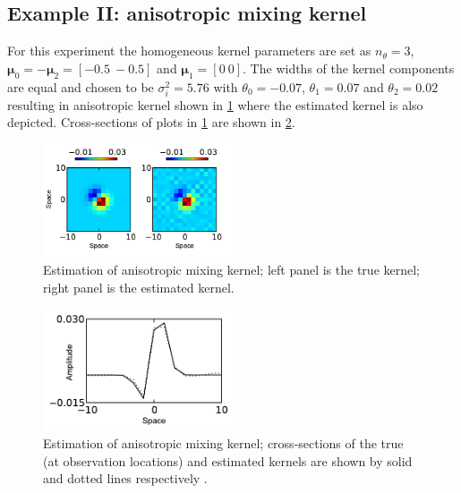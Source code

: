 \documentclass[10pt,twocolumn,twoside]{IEEEtran}
\begin{document}
\subsection{Example II: anisotropic mixing kernel}
For this experiment the homogeneous kernel parameters are set as $n_\theta=3$, $\boldsymbol\mu_0=-\boldsymbol\mu_2=[-0.5~-0.5]$ and $\boldsymbol\mu_1=[0~0]$. The widths  of the kernel components are equal and chosen to be $\sigma_i^2=5.76$ with $\theta_0=-0.07$, $\theta_1=0.07$ and $\theta_2=0.02$ resulting in anisotropic kernel shown in \figurename{\ref{fig:anisoKernel2d}} where the estimated kernel is also depicted. Cross-sections of plots in \figurename{\ref{fig:anisoKernel2d}} are shown in \figurename{\ref{fig:anisoKernel1d}}.
\begin{figure}[!h] 
 \centering
 \includegraphics[width=0.5\textwidth]{./Graph/anisoKernelEstimation2d.pdf}
 \caption{Estimation of anisotropic mixing kernel; left panel is the true kernel; right panel is the estimated kernel.}
 \label{fig:anisoKernel2d}
 \end{figure}
\begin{figure}[!h] 
 \centering
 \includegraphics[width=0.5\textwidth]{./Graph/anisoKernelSupportEstimation1d.pdf}
 \caption{Estimation of anisotropic mixing kernel;  cross-sections of the true (at observation locations) and estimated kernels are shown by solid and dotted lines respectively .}
 \label{fig:anisoKernel1d}    
 \end{figure}  
\end{document}
